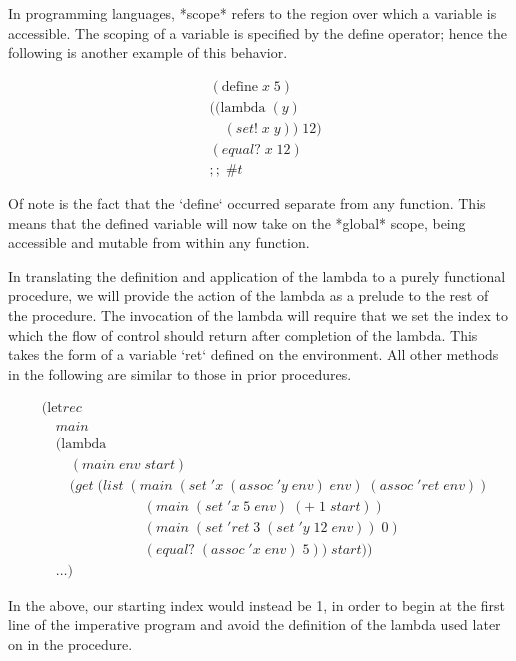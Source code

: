 In programming languages, *scope* refers to the region over which a variable is
accessible. The scoping of a variable is specified by the define operator; hence the 
following is another example of this behavior.

\begin{align*}
& (\text{define} \; x \; 5)
\\& ((\text{lambda} \; (y)
\\& \quad (set! \; x \; y)) \; 12)
\\& (equal? \; x \; 12) \; 
\\& ;; \; \#t
\end{align*}

Of note is the fact that the `define` occurred separate from any function. This 
means that the defined variable will now take on the *global* scope, being accessible 
and mutable from within any function. 

In translating the definition and application of the lambda to a purely functional
procedure, we will provide the action of the lambda as a prelude to the rest of the 
procedure. The invocation of the lambda will require that we set the index to which
the flow of control should return after completion of the lambda. This takes the form
of a variable `ret` defined on the environment. All other methods in the following are
similar to those in prior procedures.

\begin{align*}
& (\text{let}rec \; 
\\& \quad main \; 
\\& \quad (\text{lambda} \; 
\\& \qquad (main \; env \; start)
\\& \qquad (get \; (list \; (main \; (set \; 'x \; (assoc \; 'y \; env) \; env) \; (assoc \; 'ret \; env))
\\& \qquad \qquad \qquad \quad \; (main \; (set \; 'x \; 5 \; env) \; (+ \; 1 \; start))
\\& \qquad \qquad \qquad \quad \; (main \; (set \; 'ret \; 3 \; (set \; 'y \; 12 \; env)) \; 0)
\\& \qquad \qquad \qquad \quad \; (equal? \; (assoc \; 'x \; env) \; 5)) \; start))
\\& \quad \dots)
\end{align*}

In the above, our starting index would instead be 1, in order to begin at the first
line of the imperative program and avoid the definition of the lambda used later on
in the procedure.

